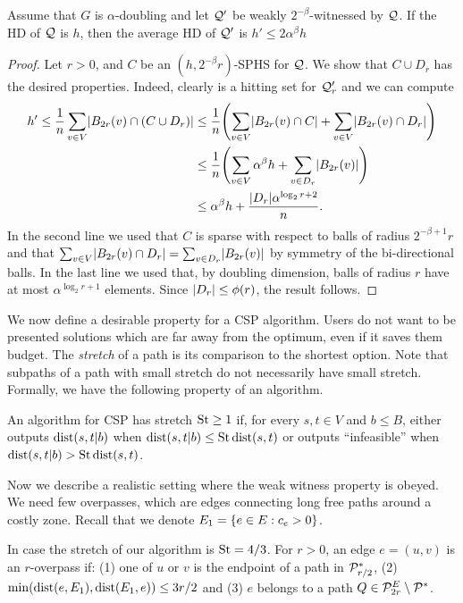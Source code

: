 \documentclass[letterpaper,11pt]{article}
\begin{document}
\begin{proposition}
Assume that $G$ is $\alpha$-doubling and let $\mathcal{Q}'$ be weakly $2^{-\beta}$-witnessed by $\mathcal{Q}$.
If the HD of $\mathcal{Q}$ is $h$, then the average HD of $\mathcal{Q}'$ is $h'\leq 2\alpha^{\beta}h$
\end{proposition}
\begin{proof}
Let $r>0$, and $C$ be an $(h,2^{-\beta}r)$-SPHS for $\mathcal{Q}$.
We show that $C\cup D_r$ has the desired properties.
Indeed, clearly is a hitting set for $\mathcal{Q}'_r$ and we can compute
\begin{align*}
h'\leq \frac{1}{n}\sum_{v\in V} \abs{B_{2r}(v)\cap (C\cup D_r)}
&\leq \frac{1}{n}\prn*{\sum_{v\in V} \abs{B_{2r}(v)\cap C}+\sum_{v\in V} \abs{B_{2r}(v)\cap D_r}}\\
&\leq \frac{1}{n}\prn*{\sum_{v\in V} \alpha^\beta h+\sum_{v\in D_r} \abs{B_{2r}(v)}}\\
&\leq \alpha^\beta h + \frac{\abs{D_r}\alpha^{\log_2r+2}}{n}.
\end{align*}
In the second line we used that $C$ is sparse with respect to balls of radius $2^{-\beta+1}r$ and that $\sum_{v\in V} \lvert B_{2r}(v)\cap D_r\rvert=\sum_{v\in D_r} \lvert B_{2r}(v)\rvert$ by symmetry of the bi-directional balls.
In the last line we used that, by doubling dimension, balls of radius $r$ have at most $\alpha^{\log_2r+1}$ elements.
Since $\lvert D_r\rvert\leq \phi(r)$, the result follows.
\end{proof}

We now define a desirable property for a CSP algorithm.
Users do not want to be presented solutions which are far away from the optimum, even if it saves them budget.
The \emph{stretch} of a path is its comparison to the shortest option.
Note that subpaths of a path with small stretch do not necessarily have small stretch.
Formally, we have the following property of an algorithm.

\begin{definition}[Stretch]
An algorithm for CSP has stretch $\operatorname{St}\geq 1$ if, for every $s,t\in V$ and $b\leq B$, either outputs $\mbox{dist}(s,t|b)$ when $\mbox{dist}(s,t|b)\leq \operatorname{St}\mbox{dist}(s,t)$ or outputs ``infeasible'' when $\mbox{dist}(s,t|b)>\operatorname{St}\mbox{dist}(s,t)$.
\end{definition}


Now we describe a realistic setting where the weak witness property is obeyed.
We need few overpasses, which are edges connecting long free paths around a costly zone.
Recall that we denote $E_1=\{e\in E:c_e>0\}$.

\begin{definition}
In case the stretch of our algorithm is $\operatorname{St}=4/3$.
For $r>0$, an edge $e=(u,v)$ is an $r$-overpass if: (1) one of $u$ or $v$ is the endpoint of a path in $\mathcal{P}^*_{r/2}$, (2) $\min(\mbox{dist}(e,E_1),\mbox{dist}(E_1,e))\leq 3r/2$ and (3) $e$ belongs to a path $Q\in\mathcal{P}^E_{2r}\setminus\mathcal{P}^*$.
\end{definition} 
\end{document}
